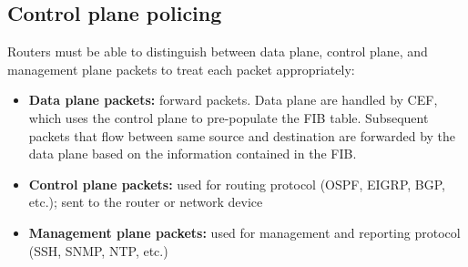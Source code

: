 \subsection{Control plane policing}

Routers must be able to distinguish between data plane, control plane, and management plane packets to treat each packet appropriately:

\begin{itemize}
\item \textbf{Data plane packets:} forward packets. Data plane are handled by CEF, which uses the control plane to pre-populate the FIB table. Subsequent packets that flow between same source and destination are forwarded by the data plane based on the information contained in the FIB.
\item \textbf{Control plane packets:} used for routing protocol (OSPF, EIGRP, BGP, etc.); sent to the router or network device
\item \textbf{Management plane packets:} used for management and reporting protocol (SSH, SNMP, NTP, etc.)
\end{itemize}
